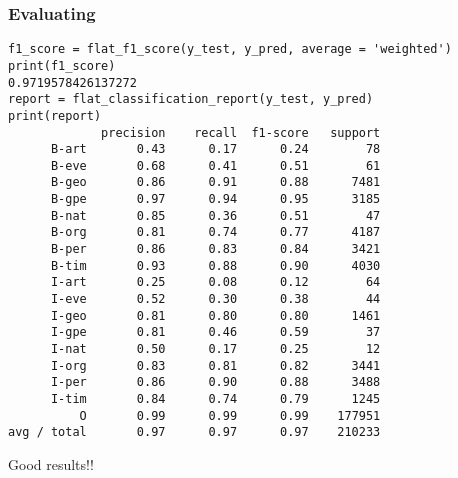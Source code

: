 \begin{frame}[fragile]\frametitle{Evaluating}
\begin{lstlisting}
f1_score = flat_f1_score(y_test, y_pred, average = 'weighted')
print(f1_score)
0.9719578426137272
report = flat_classification_report(y_test, y_pred)
print(report)
             precision    recall  f1-score   support
      B-art       0.43      0.17      0.24        78
      B-eve       0.68      0.41      0.51        61
      B-geo       0.86      0.91      0.88      7481
      B-gpe       0.97      0.94      0.95      3185
      B-nat       0.85      0.36      0.51        47
      B-org       0.81      0.74      0.77      4187
      B-per       0.86      0.83      0.84      3421
      B-tim       0.93      0.88      0.90      4030
      I-art       0.25      0.08      0.12        64
      I-eve       0.52      0.30      0.38        44
      I-geo       0.81      0.80      0.80      1461
      I-gpe       0.81      0.46      0.59        37
      I-nat       0.50      0.17      0.25        12
      I-org       0.83      0.81      0.82      3441
      I-per       0.86      0.90      0.88      3488
      I-tim       0.84      0.74      0.79      1245
          O       0.99      0.99      0.99    177951
avg / total       0.97      0.97      0.97    210233
\end{lstlisting}

Good results!!
\end{frame}